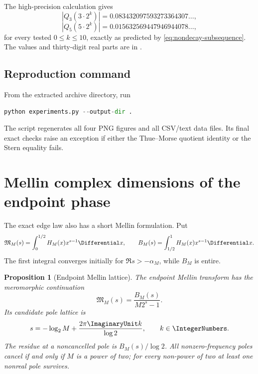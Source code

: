 \documentclass[11pt,oneside]{article}
\newtheorem{proposition}[theorem]{Proposition}
\theoremstyle{definition}
\theoremstyle{remark}
\begin{document}
The high-precision calculation gives
\[
 |Q_3(3\cdot2^k)|=0.083432097593273364307\ldots,
\]
\[
 |Q_5(5\cdot2^k)|=0.015632569447946944078\ldots,
\]
for every tested $0\le k\le10$, exactly as predicted by
\eqref{eq:nondecay-subsequence}.  The values and thirty-digit real parts are in
.

\subsection{Reproduction command}

From the extracted archive directory, run
\begin{lstlisting}[style=pseudo,language=Python,breaklines=true]
python experiments.py --output-dir .
\end{lstlisting}
The script regenerates all four PNG figures and all CSV/text data files.  Its final exact
checks raise an exception if either the Thue--Morse quotient identity or the Stern equality
fails.

\section{Mellin complex dimensions of the endpoint phase}
\label{sec:mellin-phase}

The exact edge law also has a short Mellin formulation.  Put
\begin{equation}
 \mathfrak M_M(s)=\int_0^{1/2}H_M(x)x^{s-1}\Differential x,
 \qquad
 B_M(s)=\int_{1/2}^{1}H_M(x)x^{s-1}\Differential x.
 \label{eq:endpoint-Mellin-def}
\end{equation}
The first integral converges initially for $\Re s>-\alpha_M$, while $B_M$ is entire.

\begin{proposition}[Endpoint Mellin lattice]
\label{prop:endpoint-Mellin}
The endpoint Mellin transform has the meromorphic continuation
\begin{equation}
 \boxed{
 \mathfrak M_M(s)=\frac{B_M(s)}{M2^s-1}.}
 \label{eq:endpoint-Mellin}
\end{equation}
Its candidate pole lattice is
\begin{equation}
 s=-\log_2M+\frac{2\pi\ImaginaryUnit k}{\log2},
 \qquad k\in\IntegerNumbers.
 \label{eq:endpoint-pole-lattice}
\end{equation}
The residue at a noncancelled pole is $B_M(s)/\log2$.  All nonzero-frequency poles cancel
if and only if $M$ is a power of two; for every non-power of two at least one nonreal pole
survives.
\end{proposition}
\end{document}
